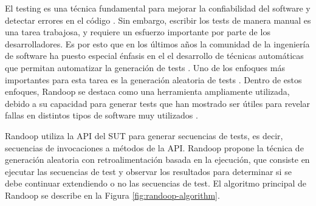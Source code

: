             
            
                
    
El testing es una técnica fundamental para mejorar la confiabilidad del software
y detectar errores en el código \cite{Ammann16}. 
Sin embargo, escribir los tests de manera manual es una tarea trabajosa, y
requiere un esfuerzo importante por parte de los desarrolladores. Es por esto
que en los últimos años la comunidad de la ingeniería de software ha puesto especial énfasis en el
el desarrollo de técnicas automáticas que permitan automatizar la generación de
tests \cite{} . 
Uno de los enfoques más importantes para esta tarea es la generación aleatoria
de tests \cite{} . 
Dentro de estos enfoques, Randoop se destaca como una herramienta ampliamente
utilizada, debido a su capacidad para generar tests que han mostrado ser útiles para revelar
fallas en distintos tipos de software muy utilizados \cite{} 
.

Randoop utiliza la API del SUT para generar secuencias de tests, es decir,
secuencias de invocaciones a métodos de la API. Randoop propone la técnica
de generación aleatoria con retroalimentación basada en la ejecución, que
consiste en ejecutar las secuencias de test y observar los resultados para 
determinar si se debe continuar extendiendo o no las secuencias de test. 
El algoritmo principal de Randoop se describe en la Figura \ref{fig:randoop-algorithm}.

